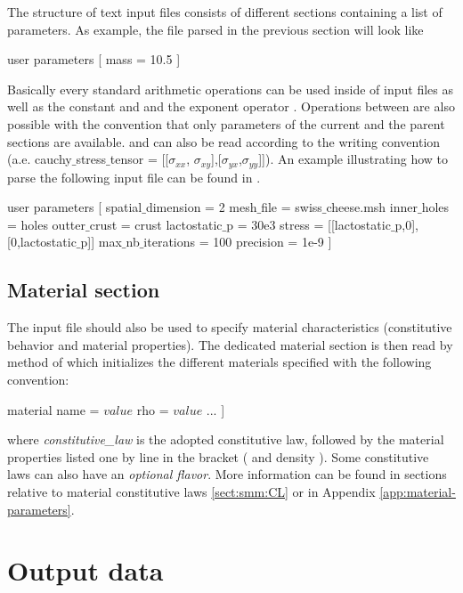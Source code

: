 The structure of text input files consists of different sections containing a list of parameters. As example, the file parsed in the previous section will look like
\begin{cpp}
  user parameters [
     mass = 10.5
  ]
\end{cpp}  
Basically every standard arithmetic operations can be used inside of input files as well as the constant  and  and the exponent operator \code{\^{}}. Operations between  are also possible with the convention that only parameters of the current and the parent sections are available.  and  can also be read according to the \cite{numpy} writing convention (a.e. cauchy$\_$stress$\_$tensor = [[$\sigma_{xx}$, $\sigma_{xy}$],[$\sigma_{yx}$,$\sigma_{yy}$]]). 
An example illustrating how to parse the following input file can be found in .
\begin{cpp}
user parameters [
   spatial$\_$dimension = 2
   mesh$\_$file = swiss$\_$cheese.msh
   inner$\_$holes = holes
   outter$\_$crust = crust
   lactostatic$\_$p = 30e3
   stress = [[lactostatic$\_$p,0],[0,lactostatic$\_$p]]
   max$\_$nb$\_$iterations = 100
   precision = 1e-9
]
\end{cpp}
\subsection{Material section \label{sect:io:material}}
The input file should also be used to specify material characteristics (constitutive behavior and material properties). The dedicated material section is then read by  method of  which initializes the different materials specified with the following convention:
\begin{cpp}
  material %
     name = $value$
     rho = $value$
     ...
  ]
\end{cpp}
 where \emph{constitutive\_law} is the adopted
constitutive law, followed by the material properties listed one by line in the
bracket (\eg {} and density ). Some constitutive laws can
also have an \emph{optional flavor}. More information can be found in sections relative to material
constitutive laws \ref{sect:smm:CL} or in Appendix \ref{app:material-parameters}.

\section{Output data}

